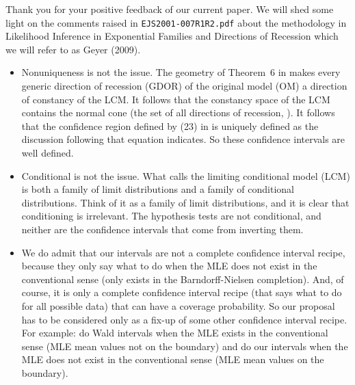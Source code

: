 \documentclass[12pt]{article}
\begin{document}
Thank you for your positive feedback of our current paper.  We will shed some light on the comments raised in \texttt{EJS2001-007R1R2.pdf} about the methodology in  Likelihood Inference in Exponential Families and Directions of Recession which we will refer to as Geyer (2009). 
\begin{itemize}
\item Nonuniqueness is not the issue.  The geometry of Theorem~6
    in \citet{geyer-gdor} makes every generic direction of recession 
    (GDOR) of the original model (OM) a direction of constancy of the LCM.
    It follows that the constancy space of the LCM contains the normal
    cone (the set of all directions of recession,
    \citealp[Theorem~3]{geyer-gdor}).  It follows that the confidence
    region defined by (23) in \citet{geyer-gdor} is uniquely defined
    as the discussion following that equation indicates.
    So these confidence intervals are well defined.
\item Conditional is not the issue.  What \citet{geyer-gdor} calls the
    limiting conditional model (LCM) is both a family of limit distributions
    and a family of conditional distributions.  Think of it as a family
    of limit distributions, and it is clear that conditioning is irrelevant.
    The hypothesis tests are not conditional, and neither are the
    confidence intervals that come from inverting them.
\item We do admit that our intervals are not a complete confidence interval recipe, because they only say what to do when the MLE does not exist in the conventional sense (only exists in the Barndorff-Nielsen completion).  And, of course, it is only a complete confidence interval recipe (that says what to do for all possible data) that can have a coverage probability.  So our proposal has to be considered only as a fix-up of some other confidence interval recipe.  For example: do Wald intervals when the MLE exists in the conventional sense (MLE mean values not on the boundary) and do our intervals when the MLE does not exist in the conventional sense (MLE mean values on the boundary). %
\end{itemize}
\end{document}
